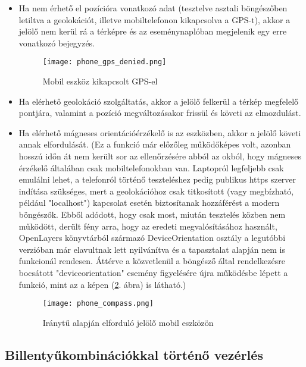 \begin{itemize}

  \item Ha nem érhető el pozícióra vonatkozó adat (tesztelve asztali
  böngészőben letiltva a geolokációt, illetve mobiltelefonon kikapcsolva a
  GPS-t), akkor a jelölő nem kerül rá a térképre és az eseménynaplóban
  megjelenik egy erre vonatkozó bejegyzés.
  \begin{figure}[H]
    \texttt{[image: phone\_gps\_denied.png]}
    \caption{Mobil eszköz kikapcsolt GPS-el}
    \label{fig:phone_gps_denied}
  \end{figure}

  \item Ha elérhető geolokáció szolgáltatás, akkor a jelölő felkerül a térkép
  megfelelő pontjára, valamint a pozíció megváltozásakor frissül és követi az
  elmozdulást.

  \item Ha elérhető mágneses orientációérzékelő is az eszközben, akkor a jelölő
  követi annak elfordulását.
  (Ez a funkció már előzőleg működőképes volt, azonban hosszú időn át nem került
  sor az ellenőrzésére abból az okból, hogy mágneses érzékelő általában csak
  mobiltelefonokban van. Laptopról legfeljebb csak emulálni lehet, a telefonról
  történő teszteléshez pedig publikus https szerver indítása szükséges, mert a
  geolokációhoz csak titkosított (vagy megbízható, például "localhost")
  kapcsolat esetén biztosítanak hozzáférést a modern böngészők. Ebből adódott,
  hogy csak most, miután tesztelés közben nem működött, derült fény arra, hogy
  az eredeti megvalósításához használt, OpenLayers könyvtárból származó
  DeviceOrientation osztály a legutóbbi verzióban már elavultnak lett
  nyilvánítva és a tapasztalat alapján nem is funkcionál rendesen. Áttérve a
  közvetlenül a böngésző által rendelkezésre bocsátott "deviceorientation"
  esemény figyelésére újra működésbe lépett a funkció, mint az a képen
  (\ref{fig:phone_compass}. ábra) is látható.)

  \begin{figure}[H]
    \texttt{[image: phone\_compass.png]}
    \caption{Iránytű alapján elforduló jelölő mobil eszközön}
    \label{fig:phone_compass}
  \end{figure}

\end{itemize}


\subsection{Billentyűkombinációkkal történő vezérlés}

